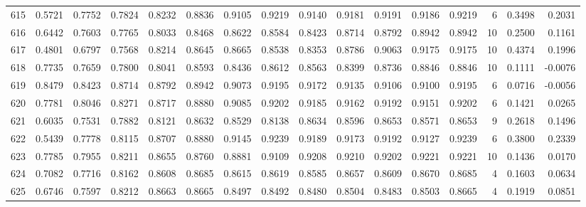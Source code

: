 \begin{tabular}{lrrrrrrrrrrrrrrr}
615 &      0.5721 &  0.7752 &  0.7824 &  0.8232 &  0.8836 &  0.9105 &  0.9219 &  0.9140 &  0.9181 &  0.9191 &   0.9186 &     0.9219 &      6 &                    0.3498 &                     0.2031 \\
616 &      0.6442 &  0.7603 &  0.7765 &  0.8033 &  0.8468 &  0.8622 &  0.8584 &  0.8423 &  0.8714 &  0.8792 &   0.8942 &     0.8942 &     10 &                    0.2500 &                     0.1161 \\
617 &      0.4801 &  0.6797 &  0.7568 &  0.8214 &  0.8645 &  0.8665 &  0.8538 &  0.8353 &  0.8786 &  0.9063 &   0.9175 &     0.9175 &     10 &                    0.4374 &                     0.1996 \\
618 &      0.7735 &  0.7659 &  0.7800 &  0.8041 &  0.8593 &  0.8436 &  0.8612 &  0.8563 &  0.8399 &  0.8736 &   0.8846 &     0.8846 &     10 &                    0.1111 &                    -0.0076 \\
619 &      0.8479 &  0.8423 &  0.8714 &  0.8792 &  0.8942 &  0.9073 &  0.9195 &  0.9172 &  0.9135 &  0.9106 &   0.9100 &     0.9195 &      6 &                    0.0716 &                    -0.0056 \\
620 &      0.7781 &  0.8046 &  0.8271 &  0.8717 &  0.8880 &  0.9085 &  0.9202 &  0.9185 &  0.9162 &  0.9192 &   0.9151 &     0.9202 &      6 &                    0.1421 &                     0.0265 \\
621 &      0.6035 &  0.7531 &  0.7882 &  0.8121 &  0.8632 &  0.8529 &  0.8138 &  0.8634 &  0.8596 &  0.8653 &   0.8571 &     0.8653 &      9 &                    0.2618 &                     0.1496 \\
622 &      0.5439 &  0.7778 &  0.8115 &  0.8707 &  0.8880 &  0.9145 &  0.9239 &  0.9189 &  0.9173 &  0.9192 &   0.9127 &     0.9239 &      6 &                    0.3800 &                     0.2339 \\
623 &      0.7785 &  0.7955 &  0.8211 &  0.8655 &  0.8760 &  0.8881 &  0.9109 &  0.9208 &  0.9210 &  0.9202 &   0.9221 &     0.9221 &     10 &                    0.1436 &                     0.0170 \\
624 &      0.7082 &  0.7716 &  0.8162 &  0.8608 &  0.8685 &  0.8615 &  0.8619 &  0.8585 &  0.8657 &  0.8609 &   0.8670 &     0.8685 &      4 &                    0.1603 &                     0.0634 \\
625 &      0.6746 &  0.7597 &  0.8212 &  0.8663 &  0.8665 &  0.8497 &  0.8492 &  0.8480 &  0.8504 &  0.8483 &   0.8503 &     0.8665 &      4 &                    0.1919 &                     0.0851 \\

\end{tabular}
